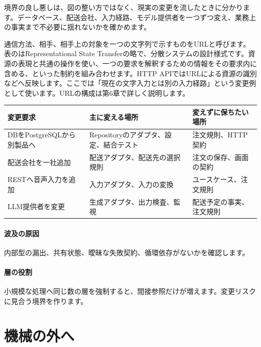境界の良し悪しは、図の整い方ではなく、現実の変更を流したときに分かります。データベース、配送会社、入力経路、モデル提供者を一つずつ変え、業務上の事実まで不必要に揺れないかを確かめます。

通信方法、相手、相手上の対象を一つの文字列で示すものをURLと呼びます。表のはRepresentational State Transferの略で、分散システムの設計様式です。資源の表現と共通の操作を使い、一つの要求を解釈するための情報をその要求内に含める、といった制約を組み合わせます。HTTP APIではURLによる資源の識別などへ反映します。ここでは「現在の文字入力とは別の入力経路」という変更例として使います。URLの構成は第6章で詳しく説明します。

\begingroup
  \noindent
  \begin{tabularx}{\textwidth}{@{}lYY@{}}
    \toprule
    変更要求 & 主に変える場所 & 変えずに保ちたい場所\\
    \midrule
    DBをPostgreSQLから別製品へ & Repositoryのアダプタ、設定、結合テスト & 注文規則、HTTP契約\\ \addlinespace[.7mm]
    配送会社を一社追加 & 配送アダプタ、配送先の選択規則 & 注文の保存、画面の契約\\ \addlinespace[.7mm]
    RESTへ音声入力を追加 & 入力アダプタ、入力の変換 & ユースケース、注文規則\\ \addlinespace[.7mm]
    LLM提供者を変更 & 生成アダプタ、出力検査、監視 & 配送予定の事実、注文規則\\
    \bottomrule
  \end{tabularx}
  \vspace{4mm}
\begingroup
\paragraph{波及の原因}
        内部型の漏出、共有状態、曖昧な失敗契約、循環依存がないかを確認します。

\par
\endgroup
\medskip
\begingroup
\paragraph{層の役割}
        小規模な処理へ同じ数の層を強制すると、間接参照だけが増えます。変更リスクに見合う境界を作ります。

\par
\endgroup
\par
\endgroup


\section{機械の外へ}
\label{sec:04-software-engineering-22}


